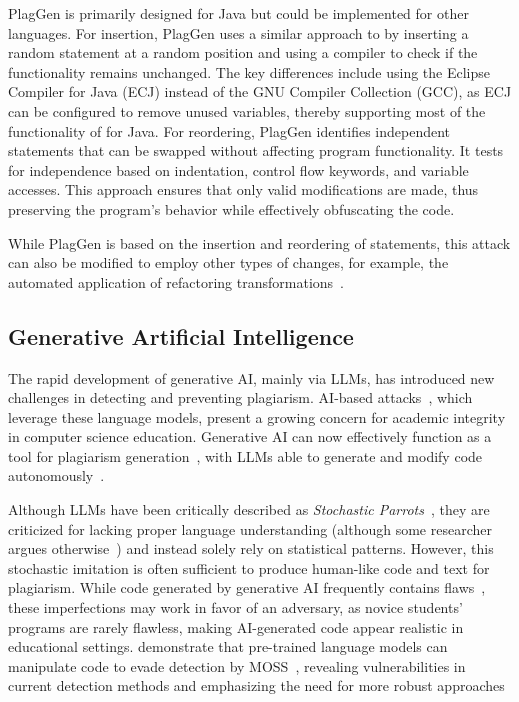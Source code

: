 PlagGen is primarily designed for Java but could be implemented for other languages.
For insertion, PlagGen uses a similar approach to \mossad by inserting a random statement at a random position and using a compiler to check if the functionality remains unchanged. The key differences include using the Eclipse Compiler for Java (ECJ) instead of the GNU Compiler Collection (GCC), as ECJ can be configured to remove unused variables, thereby supporting most of the functionality of \mossad for Java.
For reordering, PlagGen identifies independent statements that can be swapped without affecting program functionality. It tests for independence based on indentation, control flow keywords, and variable accesses. This approach ensures that only valid modifications are made, thus preserving the program's behavior while effectively obfuscating the code.

While PlagGen is based on the insertion and reordering of statements, this attack can also be modified to employ other types of changes, for example, the automated application of refactoring transformations~\cite{Maisch2024}.


\subsection{Generative Artificial Intelligence}

The rapid development of generative AI, mainly via \acp{LLM}, has introduced new challenges in detecting and preventing plagiarism. AI-based attacks~\cite{Biderman2022}, which leverage these language models, present a growing concern for academic integrity in computer science education. Generative AI can now effectively function as a tool for plagiarism generation~\cite{Khalil_Er_2023}, with \acp{LLM} able to generate and modify code autonomously~\cite{Camara2023, Daun2023}.

Although \acp{LLM} have been critically described as \textit{Stochastic Parrots}~\cite{Bender2021}, they are criticized for lacking proper language understanding (although some researcher argues otherwise~\cite{Hinton2024}) and instead solely rely on statistical patterns.
However, this stochastic imitation is often sufficient to produce human-like code and text for plagiarism. While code generated by generative AI frequently contains flaws~\cite{Choudhuri2024, Camara2023, Ouyang2023}, these imperfections may work in favor of an adversary, as novice students' programs are rarely flawless, making AI-generated code appear realistic in educational settings.
\citet{Biderman2022} demonstrate that pre-trained language models can manipulate code to evade detection by MOSS~\cite{MOSS}, revealing vulnerabilities in current detection methods and emphasizing the need for more robust approaches

